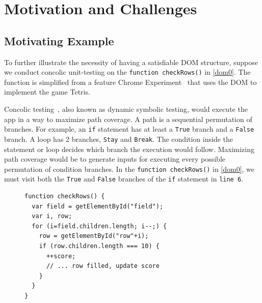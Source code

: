 \section{Motivation and Challenges}
\subsection{Motivating Example}
To further illustrate the necessity of having a satisfiable DOM structure, suppose we conduct concolic unit-testing on the {\tt function checkRows()} in \autoref{dom0}.  
The function is simplified from a feature Chrome Experiment~\cite{domtris} that uses the DOM to implement the game Tetris.  

Concolic testing~\cite{cute}, also known as dynamic symbolic testing, would execute the app in a way to maximize path coverage.
A path is a sequential permutation of branches.  For example, an {\tt if} statement has at least a {\tt True} branch and a {\tt False} branch.  
A loop has 2 branches, {\tt Stay} and {\tt Break}.  The condition inside the statement or loop decides which branch the execution would follow.  
Maximizing path coverage would be to generate inputs for executing every possible permutation of condition branches.  
In the {\tt function checkRows()} in \autoref{dom0}, we must visit both the {\tt True} and {\tt False} branches of the {\tt if} statement in {\tt line 6}.

\begin{figure}[t]
\centering
\begin{lstlisting}[caption=DOM structure dependent \js execution paths. 
%{\tt getElementById()} is equivalent to {\tt document.getElementById()}.
,label=dom0]
function checkRows() {
  var field = getElementById("field"); 
  var i, row;
  for (i=field.children.length; i--;) {
    row = getElementById("row"+i);
    if (row.children.length === 10) {
      ++score;
      // ... row filled, update score
    }
  }
}
\end{lstlisting}
\end{figure}

